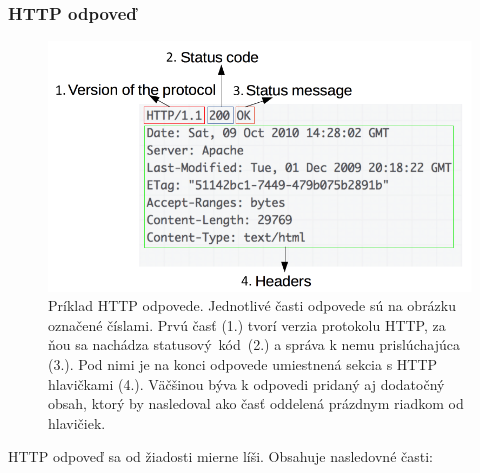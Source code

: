 \subsubsection{HTTP odpoveď}

\begin{figure}[htb]
\begin{center}
    \includegraphics[scale=0.6]{obrazky-figures/http_response.png}
    \caption{\centering Príklad HTTP odpovede. 
    Jednotlivé časti odpovede sú na obrázku označené číslami. 
    Prvú časť (1.) tvorí verzia protokolu HTTP, za ňou sa nachádza \mbox{statusový kód (2.)} a správa k nemu prislúchajúca (3.). 
    Pod nimi je na konci odpovede umiestnená sekcia s HTTP hlavičkami (4.). 
    Väčšinou býva k odpovedi pridaný aj dodatočný obsah, ktorý by nasledoval ako časť oddelená prázdnym riadkom od hlavičiek.}
    \label{fig:http-response}
\end{center}
\end{figure}

\noindent HTTP odpoveď sa od žiadosti mierne líši. Obsahuje nasledovné časti:

